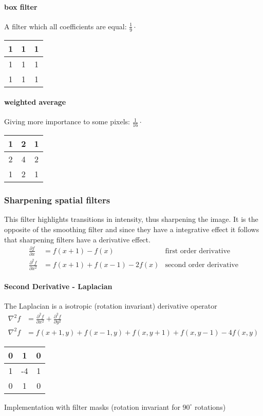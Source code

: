\paragraph{box filter}
A filter which all coefficients are equal:
$ \frac{1}{9} \cdot$ \begin{tabular}{|c|c|c|} \hline 1 & 1 & 1 \\ \hline 1 & 1 & 1 \\ \hline 1 & 1 & 1  \\ \hline \end{tabular}
\paragraph{weighted average}
Giving more importance to some pixels:
$ \frac{1}{16} \cdot$ \begin{tabular}{|c|c|c|} \hline 1 & 2 & 1 \\ \hline 2 & 4 & 2 \\ \hline 1 & 2 & 1  \\ \hline \end{tabular}
\subsubsection{Sharpening spatial filters }

This filter highlights transitions in intensity, thus sharpening the image.
It is the opposite of the smoothing filter and since they have a integrative effect it follows that sharpening filters have a derivative effect.
\begin{align}
\frac{\partial f}{\partial x} &= f(x+1) - f(x)& \text{first order derivative} \\
\frac{\partial^2 f}{\partial x^2} &= f(x+1) + f(x-1)  -2 f(x)& \text{second order derivative}
\end{align}

\paragraph{Second Derivative - Laplacian }
The Laplacian is a isotropic (rotation invariant) derivative operator
\begin{align}
\nabla^2f &= \frac{\partial^2 f}{\partial x^2} + \frac{\partial^2 f}{\partial y^2} \\
\nabla^2f &= f(x+1,y) + f(x-1,y) + f(x,y+1) + f(x,y-1) - 4 f(x,y)
\end{align}

\begin{tabular}{|c|c|c|} \hline
0 & 1 & 0  \\ \hline
1 &-4 & 1  \\ \hline
0 & 1 & 0  \\ \hline
\end{tabular}
Implementation with filter masks (rotation invariant for $90^\circ$ rotations) \\ \vspace{3mm}

